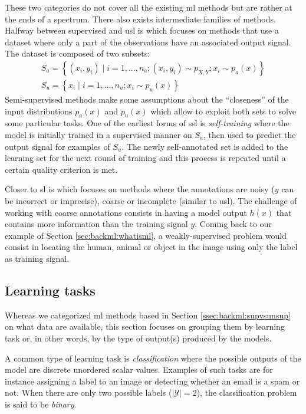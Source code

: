 These two categories do not cover all the existing \acrlong{ml} methods but are rather at the ends of a spectrum. There also exists intermediate families of methods. Halfway between supervised and \acrlong{usl} is  which focuses on methods that use a dataset where only a part of the observations have an associated output signal. The dataset is composed of two subsets:
\begin{eqnarray}
S_a = \left\{(x_i, y_i) \mid i = 1,...,n_a; (x_i, y_i) \sim p_{X,Y}; x_i \sim p_a(x)\right\} \\
S_u = \left\{x_i \mid i = 1,...,n_u; x_i \sim p_u(x)\right\}
\end{eqnarray}
Semi-supervised methods make some assumptions about the ``closeness'' of the input distributions $p_a(x)$ and $p_u(x)$ \parencite{chapelle2006semi} which allow to exploit both sets to solve some particular tasks. One of the earliest forms of \acrshort{ssl} is \textit{self-training} where the model is initially trained in a supervised manner on $S_a$, then used to predict the output signal for examples of $S_u$. The newly self-annotated set is added to the learning set for the next round of training and this process is repeated until a certain quality criterion is met.  

Closer to \acrlong{sl} is  which focuses on methods where the annotations are noisy (\eg $y$ can be incorrect or imprecise), coarse or incomplete (similar to \acrlong{usl}). The challenge of working with coarse annotations consists in having a model output $h(x)$ that contains more information than the training signal $y$. Coming back to our example of Section \ref{sec:backml:whatisml}, a weakly-supervised problem would consist in locating the human, animal or object in the image using only the label as training signal.

\subsection{Learning tasks}
\label{ssec:backml:learningtasks}

Whereas we categorized \acrshort{ml} methods based in Section \ref{ssec:backml:supvsunsup} on what data are available, this section focuses on grouping them by learning task or, in other words, by the type of output(s) produced by the models. 

A common type of learning task is \textit{classification} where the possible outputs of the model are discrete unordered scalar values. Examples of such tasks are for instance assigning a label to an image or detecting whether an email is a spam or not. When there are only two possible labels ($\left|\mathcal{Y}\right| = 2$), the classification problem is said to be \textit{binary}.


